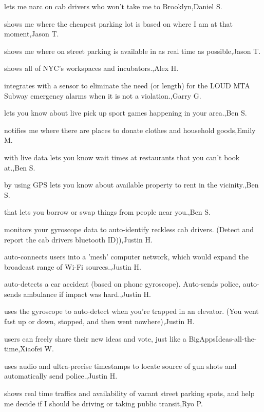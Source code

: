 \documentclass{article}
\begin{document}
lets me narc on cab drivers who won't take me to Brooklyn,Daniel S.

shows me where the cheapest parking lot is based on where I am at that moment,Jason  T.

shows me where on street parking is available in as real time as possible,Jason  T.

shows all of NYC's workspaces and incubators.,Alex H.

integrates with a sensor to eliminate the need (or length) for the LOUD MTA Subway emergency alarms when it is not a violation.,Garry G.

lets you know about live pick up sport games happening in your area.,Ben S.

notifies me where there are places to donate clothes and household goods,Emily M.

with live data lets you know wait times at restaurants that you can't book at.,Ben S.

by using GPS lets you know about available property to rent in the vicinity.,Ben S.

that lets you borrow or swap things from people near you.,Ben S.

monitors your gyroscope data to auto-identify reckless cab drivers. (Detect and report the cab drivers bluetooth ID)),Justin H.

auto-connects users into a 'mesh' computer network, which would expand the broadcast range of Wi-Fi sources.,Justin H.

 auto-detects a car accident (based on phone gyroscope). Auto-sends police, auto-sends ambulance if impact was hard.,Justin H.

uses the gyroscope to auto-detect when you're trapped in an elevator. (You went fast up or down, stopped, and then went nowhere),Justin H.

users can freely share their new ideas and vote, just like a BigAppsIdeas-all-the-time,Xiaofei W.

uses audio and ultra-precise timestamps to locate source of gun shots and automatically send police.,Justin H.

shows real time traffics and availability of vacant street parking spots, and help me decide if I should be driving or taking public transit,Ryo P.
\end{document}

